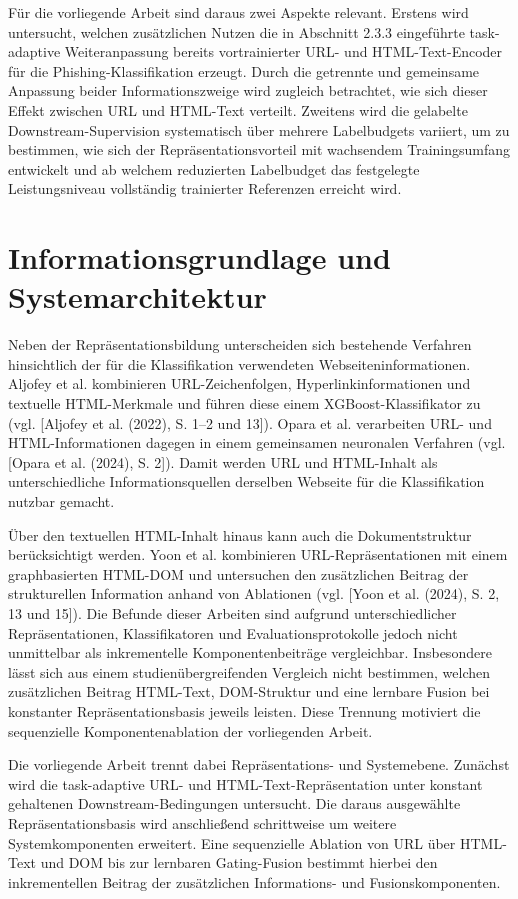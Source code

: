 Für die vorliegende Arbeit sind daraus zwei Aspekte relevant. Erstens wird untersucht,
welchen zusätzlichen Nutzen die in Abschnitt 2.3.3 eingeführte task-adaptive
Weiteranpassung bereits vortrainierter URL- und HTML-Text-Encoder für die
Phishing-Klassifikation erzeugt. Durch die getrennte und gemeinsame Anpassung beider
Informationszweige wird zugleich betrachtet, wie sich dieser Effekt zwischen URL und
HTML-Text verteilt. Zweitens wird die gelabelte Downstream-Supervision systematisch
über mehrere Labelbudgets variiert, um zu bestimmen, wie sich der
Repräsentationsvorteil mit wachsendem Trainingsumfang entwickelt und ab welchem
reduzierten Labelbudget das festgelegte Leistungsniveau vollständig trainierter
Referenzen erreicht wird.

\section{Informationsgrundlage und Systemarchitektur}

Neben der Repräsentationsbildung unterscheiden sich bestehende Verfahren hinsichtlich
der für die Klassifikation verwendeten Webseiteninformationen. Aljofey et al. kombinieren
URL-Zeichenfolgen, Hyperlinkinformationen und textuelle HTML-Merkmale und führen diese
einem XGBoost-Klassifikator zu
(vgl. [Aljofey et al. (2022), S. 1--2 und 13]). Opara et al. verarbeiten URL- und
HTML-Informationen dagegen in einem gemeinsamen neuronalen Verfahren
(vgl. [Opara et al. (2024), S. 2]). Damit werden URL und HTML-Inhalt als unterschiedliche
Informationsquellen derselben Webseite für die Klassifikation nutzbar gemacht.

Über den textuellen HTML-Inhalt hinaus kann auch die Dokumentstruktur berücksichtigt
werden. Yoon et al. kombinieren URL-Repräsentationen mit einem graphbasierten
HTML-DOM und untersuchen den zusätzlichen Beitrag der strukturellen Information anhand
von Ablationen (vgl. [Yoon et al. (2024), S. 2, 13 und 15]). Die Befunde dieser Arbeiten
sind aufgrund unterschiedlicher Repräsentationen, Klassifikatoren und
Evaluationsprotokolle jedoch nicht unmittelbar als inkrementelle Komponentenbeiträge
vergleichbar. Insbesondere lässt sich aus einem studienübergreifenden Vergleich nicht
bestimmen, welchen zusätzlichen Beitrag HTML-Text, DOM-Struktur und eine lernbare
Fusion bei konstanter Repräsentationsbasis jeweils leisten. Diese Trennung motiviert die
sequenzielle Komponentenablation der vorliegenden Arbeit.

Die vorliegende Arbeit trennt dabei Repräsentations- und Systemebene. Zunächst wird die
task-adaptive URL- und HTML-Text-Repräsentation unter konstant gehaltenen
Downstream-Bedingungen untersucht. Die daraus ausgewählte Repräsentationsbasis wird
anschließend schrittweise um weitere Systemkomponenten erweitert. Eine sequenzielle
Ablation von URL über HTML-Text und DOM bis zur lernbaren Gating-Fusion bestimmt
hierbei den inkrementellen Beitrag der zusätzlichen Informations- und
Fusionskomponenten.

